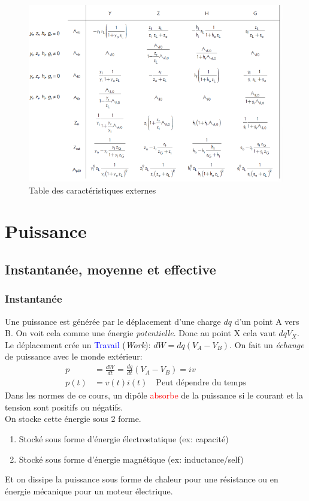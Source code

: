 \documentclass{report}
\begin{document}
\begin{figure}[H]
\centering
\includegraphics[width=14cm]{img/quadriTable.png}
\caption{Table des caractéristiques externes}
\end{figure}


\chapter{Puissance}
\section{Instantanée, moyenne et effective}

\subsection{Instantanée}
Une puissance est générée par le déplacement d'une charge $dq$ d'un point A vers B. On voit cela comme une énergie \textit{potentielle}. Donc au point X cela vaut $dq V_X$. Le déplacement crée un \textcolor{blue}{Travail} (\textit{Work}): $dW = dq (V_A - V_B)$. On fait un \textit{échange} de puissance avec le monde extérieur:
\begin{align*}
p &= \frac{dW}{dt} = \frac{dq}{dt}(V_A - V_B) = iv\\
p(t) &= v(t) i(t) \quad \text{Peut dépendre du temps}
\end{align*}
Dans les normes de ce cours, un dipôle \textcolor{red}{absorbe} de la puissance si le courant et la tension sont positifs ou négatifs.\\
On stocke cette énergie sous 2 forme.
\begin{enumerate}
\item Stocké sous forme d'énergie électrostatique (ex: capacité)
\item Stocké sous forme d'énergie magnétique (ex: inductance/self)
\end{enumerate}
Et on dissipe la puissance sous forme de chaleur pour une résistance ou en énergie mécanique pour un moteur électrique.\\
\end{document}
